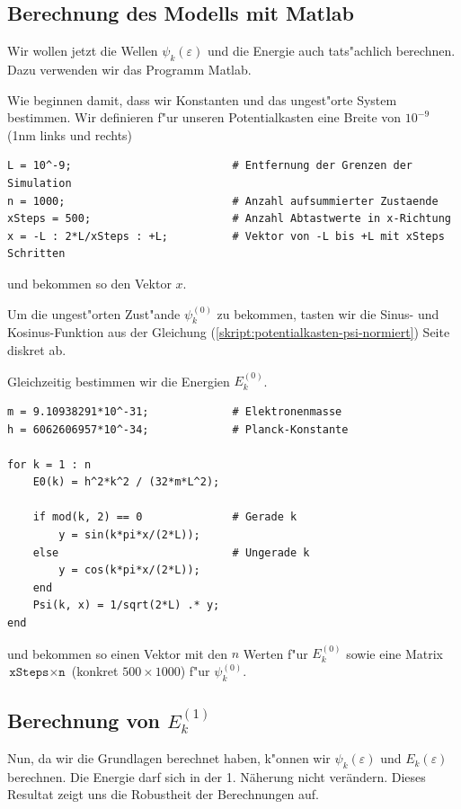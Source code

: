 \begin{refsection}
\subsection{Berechnung des Modells mit Matlab}

Wir wollen jetzt die Wellen $\psi_k(\varepsilon)$ und die Energie auch tats"achlich berechnen.
Dazu verwenden wir das Programm Matlab.

Wie beginnen damit, dass wir Konstanten und das ungest"orte System bestimmen.
Wir definieren f"ur unseren Potentialkasten eine Breite von $10^{-9}$ (1nm links und rechts)
\begin{lstlisting}[style=Matlab]
L = 10^-9;                         # Entfernung der Grenzen der Simulation
n = 1000;                          # Anzahl aufsummierter Zustaende
xSteps = 500;                      # Anzahl Abtastwerte in x-Richtung
x = -L : 2*L/xSteps : +L;          # Vektor von -L bis +L mit xSteps Schritten
\end{lstlisting}
und bekommen so den Vektor $x$.

Um die ungest"orten Zust"ande $\psi_k^{(0)}$ zu bekommen, tasten wir die Sinus- und Kosinus-Funktion 
aus der Gleichung (\ref{skript:potentialkasten-psi-normiert}) Seite \pageref{skript:potentialkasten-psi-normiert} diskret ab.

Gleichzeitig bestimmen wir die Energien $E_k^{(0)}$.
\begin{lstlisting}[style=Matlab]
m = 9.10938291*10^-31;             # Elektronenmasse
h = 6062606957*10^-34;             # Planck-Konstante

for k = 1 : n
    E0(k) = h^2*k^2 / (32*m*L^2);
    
    if mod(k, 2) == 0              # Gerade k
        y = sin(k*pi*x/(2*L));
    else                           # Ungerade k
        y = cos(k*pi*x/(2*L));
    end
    Psi(k, x) = 1/sqrt(2*L) .* y;
end
\end{lstlisting}
und bekommen so einen Vektor mit den $n$ Werten f"ur $E_k^{(0)}$
sowie eine Matrix $\texttt{xSteps} \times \texttt{n}$ (konkret $500 \times 1000$) f"ur $\psi_k^{(0)}$.

\subsection{Berechnung von $E_k^{(1)}$}

Nun, da wir die Grundlagen berechnet haben, k"onnen wir $\psi_k(\varepsilon)$ und 
$E_k(\varepsilon)$ berechnen. Die Energie darf sich in der 1. N\"aherung nicht ver\"andern.
Dieses Resultat zeigt uns die Robustheit der Berechnungen auf.


\end{refsection}
